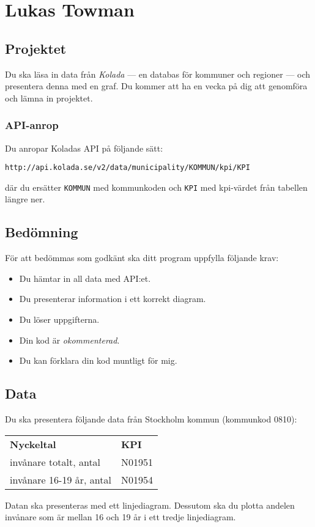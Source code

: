 \section{Lukas Towman}

\subsection{Projektet}

Du ska läsa in data från \textit{Kolada} --- en databas för kommuner och regioner --- och presentera denna med en graf. Du kommer att ha en vecka på dig att genomföra och lämna in projektet.

\subsubsection{API-anrop}

Du anropar Koladas API på följande sätt:

\texttt{http://api.kolada.se/v2/data/municipality/KOMMUN/kpi/KPI}

\noindent där du ersätter \texttt{KOMMUN} med kommunkoden och \texttt{KPI} med kpi-värdet från tabellen längre ner.

\subsection{Bedömning}

För att bedömmas som godkänt ska ditt program uppfylla följande krav:

\begin{itemize}
	\item Du hämtar in all data med API:et.
	\item Du presenterar information i ett korrekt diagram.
	\item Du löser uppgifterna.
	\item Din kod är \textit{okommenterad}.
	\item Du kan förklara din kod muntligt för mig.
\end{itemize}

\subsection{Data}

Du ska presentera följande data från Stockholm kommun (kommunkod 0810):

\begin{center}
	\begin{tabular}{ll}
		\rowcolor{blue!25}
		\textbf{Nyckeltal} & \textbf{KPI}\\
		invånare totalt, antal & N01951\\
		invånare 16-19 år, antal	& N01954
	\end{tabular}
\end{center}

Datan ska presenteras med ett linjediagram. Dessutom ska du plotta andelen invånare som är mellan 16 och 19 år i ett tredje linjediagram.

\clearpage